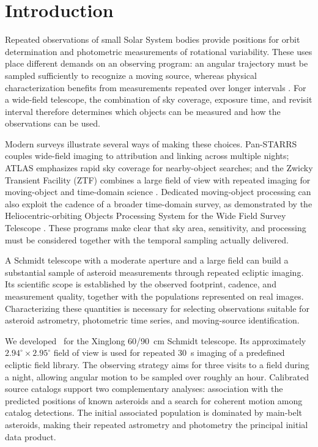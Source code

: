 \section{Introduction}
\label{sec:introduction}

Repeated observations of small Solar System bodies provide positions for
orbit determination and photometric measurements of rotational variability.
These uses place different demands on an observing program: an angular
trajectory must be sampled sufficiently to recognize a moving source,
whereas physical characterization benefits from measurements repeated over
longer intervals \citep{WarnerHarrisPravec2009,Denneau2013}. For a wide-field telescope,
the combination of sky coverage, exposure time, and revisit interval
therefore determines which objects can be measured and how the observations
can be used.

Modern surveys illustrate several ways of making these choices. Pan-STARRS
couples wide-field imaging to attribution and linking across multiple
nights; ATLAS emphasizes rapid sky coverage for nearby-object searches;
and the Zwicky Transient Facility (ZTF) combines a large field of view with
repeated imaging for moving-object and time-domain science
\citep{Denneau2013,Tonry2018,Bellm2019,Masci2019}. Dedicated moving-object
processing can also exploit the cadence of a broader time-domain survey,
as demonstrated by the Heliocentric-orbiting Objects Processing System for
the Wide Field Survey Telescope \citep{Wang2025HOPS}. These programs make
clear that sky area, sensitivity, and processing must be considered
together with the temporal sampling actually delivered.

A Schmidt telescope with a moderate aperture and a large field can build a
substantial sample of asteroid measurements through repeated ecliptic
imaging. Its scientific scope is established by the observed footprint,
cadence, and measurement quality, together with the populations represented
on real images. Characterizing these quantities is necessary for selecting
observations suitable for asteroid astrometry, photometric time series,
and moving-source identification.

We developed \SHARP\ for the Xinglong 60/90~cm Schmidt telescope. Its
approximately $2.94^\circ\times2.95^\circ$ field of view is used for repeated
30~s imaging of a predefined ecliptic field library. The observing strategy
aims for three visits to a field during a night, allowing angular motion to
be sampled over roughly an hour. Calibrated source catalogs support two
complementary analyses: association with the predicted positions of known
asteroids and a search for coherent motion among catalog detections. The
initial associated population is dominated by main-belt asteroids, making
their repeated astrometry and photometry the principal initial data product.

